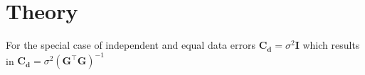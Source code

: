 \section{Theory}
For the special case of independent and equal data errors $\bm{C_d} = \sigma ^2 \bm{I}$ which results in $\bm{C_d} = \sigma^2 (\bm{G}^\intercal \bm{G})^{-1}$